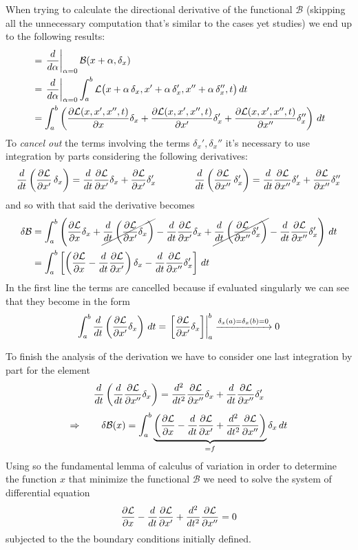 	When trying to calculate the directional derivative of the functional $\mathcal B$ (skipping all the unnecessary computation that's similar to the cases yet studies) we end up to the following results:
	\begin{align*}
		& = \left.\frac{d}{d\alpha}\right|_{\alpha = 0} \mathcal B(x+\alpha, \delta_x) \\
		& = \left. \frac{d}{d\alpha}\right|_{\alpha = 0} \int_a^b \mathcal L\big( x + \alpha\, \delta_x, x' + \alpha\, \delta_x', x''+\alpha\, \delta_x'',t\big) \, dt \\
		& = \int_a^b \left( \frac{\partial \mathcal L(x,x',x'',t)}{\partial x}\delta_x + \frac{\partial \mathcal L(x,x',x'',t)}{\partial x'}\delta_x' + \frac{\partial \mathcal L(x,x',x'',t)}{\partial x''}\delta_x'' \right) \, dt
	\end{align*}
	To \textit{cancel out} the terms involving the terms $\delta_x',\delta_x''$ it's necessary to use integration by parts considering the following derivatives:
	\[ \frac d{dt} \left(\frac{\partial \mathcal L}{\partial x'}\, \delta_x \right) = \frac d{dt} \frac{\partial \mathcal L}{\partial x'} \delta_x + \frac{\partial \mathcal L}{\partial x'} \delta_x' \qquad \qquad \frac d{dt} \left(\frac{\partial \mathcal L}{\partial x''}\, \delta_x' \right) = \frac d{dt} \frac{\partial \mathcal L}{\partial x''} \delta_x' + \frac{\partial \mathcal L}{\partial x''}\delta_x''  \]
	and so with that said the derivative becomes
	\begin{align*}
		\delta \mathcal B& = \int_a^b \left( \frac{\partial \mathcal L}{\partial x}\delta_x + \cancel{\frac d{dt} \left(\frac{\partial \mathcal L}{\partial x'} \delta_x \right)} -  \frac{d}{dt} \frac{\partial \mathcal L}{\partial x'} \delta_x + \cancel{\frac d{dt}\left( \frac{\partial \mathcal L}{\partial x''} \delta_x' \right) } - \frac{d}{dt} \frac{\partial \mathcal L}{\partial x''} \delta_x' \right)\, dt \\
		& = \int_a^b \left[\left( \frac{\partial \mathcal L}{\partial x}  -  \frac{d}{dt} \frac{\partial \mathcal L}{\partial x'} \right)\delta_x - \frac{d}{dt} \frac{\partial \mathcal L}{\partial x''} \delta_x' \right]\, dt
	\end{align*}
	In the first line the terms are cancelled because if evaluated singularly we can see that they become in the form
	\[ \int_a^b \frac d{dt} \left(\frac{\partial \mathcal L}{\partial x'} \delta_x\right) \, dt = \left. \left[ \frac{\partial \mathcal L}{\partial x'} \delta_x \right]\right|_a^b \xrightarrow{\delta_x(a) = \delta_x(b) = 0} 0  \]

	To finish the analysis of the derivation we have to consider one last integration by part for the element
	\[ \frac{d}{dt} \left( \frac{d}{dt} \frac{\partial \mathcal L}{\partial x''} \delta_x \right) = \frac{d^2}{dt^2} \frac{\partial \mathcal L}{\partial x''} \delta_x + \frac{d}{dt} \frac{\partial \mathcal L}{\partial x''} \delta_x' \]
	\begin{equation} \label{eq:func:var2}
		\Rightarrow \qquad \delta\mathcal B(x) = \int_a^b \underbrace{\left( \frac{\partial \mathcal L}{\partial x} - \frac d {dt} \frac{\partial \mathcal L}{\partial x'} + \frac{d^2}{dt^2} \frac{\partial \mathcal L}{\partial x''} \right)}_{=f} \delta_x\, dt
	\end{equation}
	Using so the fundamental lemma of calculus of variation in order to determine the function $x$ that minimize the functional $\mathcal B$ we need to solve the system of differential equation
	\[   \frac{\partial \mathcal L}{\partial x} - \frac d {dt} \frac{\partial \mathcal L}{\partial x'} + \frac{d^2}{dt^2} \frac{\partial \mathcal L}{\partial x''} = 0  \]
	subjected to the the boundary conditions initially defined.		
	
